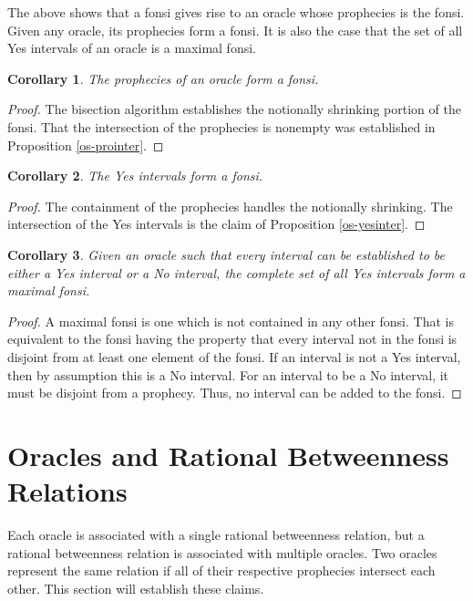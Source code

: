 \documentclass[12pt]{article}
\newtheorem{corollary}{Corollary}[section]
\begin{document}
The above shows that a fonsi gives rise to an oracle whose prophecies is the fonsi. Given any oracle, its prophecies form a fonsi. It is also the case that the set of all Yes intervals of an oracle is a maximal fonsi. 


\begin{corollary}
    The prophecies of an oracle form a fonsi.
\end{corollary}

\begin{proof}
    The bisection algorithm establishes the notionally shrinking portion of the fonsi. That the intersection of the prophecies is nonempty was established in Proposition \ref{os-prointer}.
\end{proof}


\begin{corollary}
    The Yes intervals form a fonsi. 
\end{corollary}

\begin{proof}
    The containment of the prophecies handles the notionally shrinking. The intersection of the Yes intervals is the claim of Proposition \ref{os-yesinter}.
\end{proof}


\begin{corollary}
    Given an oracle such that every interval can be established to be either a Yes interval or a No interval, the complete set of all Yes intervals form a maximal fonsi.
\end{corollary}

\begin{proof}
A maximal fonsi is one which is not contained in any other fonsi. That is equivalent to the fonsi having the property that every interval not in the fonsi is disjoint from at least one element of the fonsi. If an interval is not a Yes interval, then by assumption this is a No interval. For an interval to be a No interval, it must be disjoint from a prophecy. Thus, no interval can be added to the fonsi. 
\end{proof}



\section{Oracles and Rational Betweenness Relations}

Each oracle is associated with a single rational betweenness relation, but a rational betweenness relation is associated with multiple oracles. Two oracles represent the same relation if all of their respective prophecies intersect each other. This section will establish these claims. 
\end{document}

